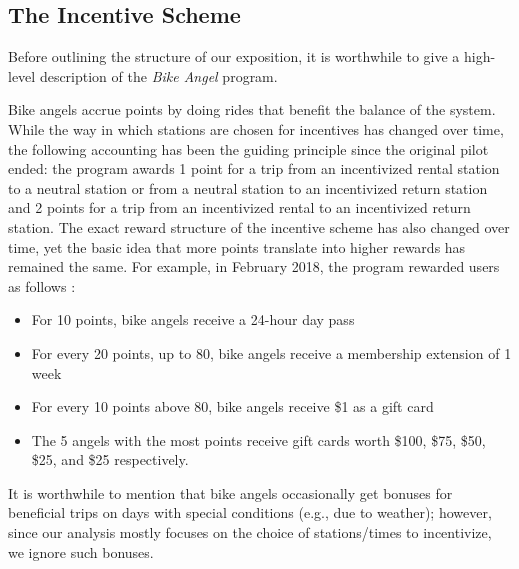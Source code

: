 
\subsection{The Incentive Scheme}

Before outlining the structure of our exposition, it is worthwhile to give a high-level description of the \emph{Bike Angel} program. 

Bike angels accrue points by doing rides that benefit the balance of the system. While the way in which stations are chosen for incentives has changed over time, the following accounting has been the guiding principle since the original pilot ended: the program awards 1 point for a trip from an incentivized rental station to a neutral station or from a neutral station to an incentivized return station and 2 points for a trip from an incentivized rental to an incentivized return station.   The exact reward structure of the incentive scheme has also changed over time, yet the basic idea that more points translate into higher rewards has remained the same. For example, in February 2018, the program rewarded users as follows \cite{bikeangels}:
\begin{itemize}
\setlength\itemsep{-.5em} 
\item For 10 points, bike angels receive a 24-hour day pass
\item For every 20 points, up to 80, bike angels receive a membership extension of 1 week
\item For every 10 points above 80, bike angels receive \$1 as a gift card
\item The 5 angels with the most points receive gift cards worth \$100, \$75, \$50, \$25, and \$25 respectively.
\end{itemize}

It is worthwhile to mention that bike angels occasionally get bonuses for beneficial trips on days with special conditions (e.g., due to weather); however, since our analysis mostly focuses on the choice of stations/times to incentivize, we ignore such bonuses.  %




